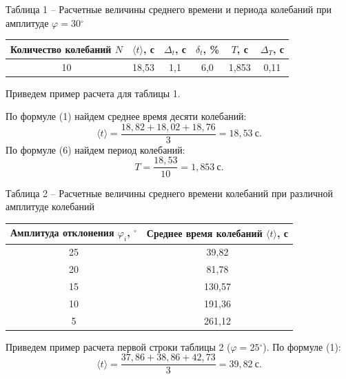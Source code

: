 \documentclass[11pt,a4paper]{article}
\newcommand{\sect}[1]{\par\vspace{10pt}{\large #1}\par\vspace{4pt}}
\newcommand{\gr}{\ensuremath{^\circ}}
\begin{document}
\sect{9. Расчет результатов косвенных измерений (таблицы, примеры расчетов).}

\begin{center}
Таблица 1 – Расчетные величины среднего времени и периода колебаний при амплитуде $\varphi=30\gr$\\[3pt]
\begin{tabular}{|c|c|c|c|c|c|}
\hline
\makecell{Количество\\колебаний $N$} & $\langle t\rangle$, с & $\Delta_t$, с & $\delta_t$, \% & $T$, с & $\Delta_T$, с\\\hline
10 & 18,53 & 1,1 & 6,0 & 1,853 & 0,11\\\hline
\end{tabular}
\end{center}

Приведем пример расчета для таблицы 1.

По формуле (1) найдем среднее время десяти колебаний:
\[
\langle t\rangle=\frac{18,82+18,02+18,76}{3}=18,53\ \text{с}.
\]
По формуле (6) найдем период колебаний:
\[
T=\frac{18,53}{10}=1,853\ \text{с}.
\]

\begin{center}
Таблица 2 – Расчетные величины среднего времени колебаний при различной амплитуде колебаний\\[3pt]
\begin{tabular}{|c|c|}
\hline
\makecell{Амплитуда\\отклонения $\varphi_i$, $^\circ$} & \makecell{Среднее время\\колебаний $\langle t\rangle$, с}\\\hline
25 & 39,82\\\hline
20 & 81,78\\\hline
15 & 130,57\\\hline
10 & 191,36\\\hline
5 & 261,12\\\hline
\end{tabular}
\end{center}

Приведем пример расчета первой строки таблицы 2 ($\varphi=25\gr$).
По формуле (1):
\[
\langle t\rangle=\frac{37,86+38,86+42,73}{3}=39,82\ \text{с}.
\]
\end{document}
